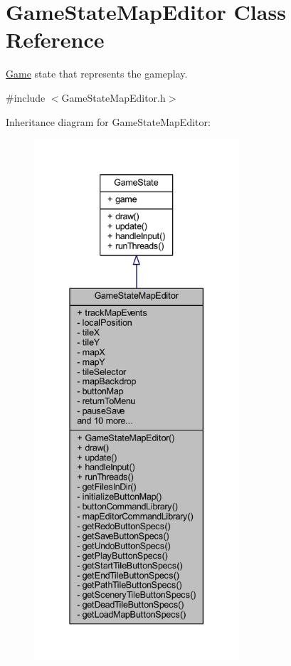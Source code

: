 \hypertarget{class_game_state_map_editor}{\section{Game\+State\+Map\+Editor Class Reference}
\label{class_game_state_map_editor}
}


\hyperlink{class_game}{Game} state that represents the gameplay.  




{\ttfamily \#include $<$Game\+State\+Map\+Editor.\+h$>$}



Inheritance diagram for Game\+State\+Map\+Editor\+:
\nopagebreak
\begin{figure}[H]
\begin{center}
\leavevmode
\includegraphics[height=550pt]{class_game_state_map_editor__inherit__graph}
\end{center}
\end{figure}



